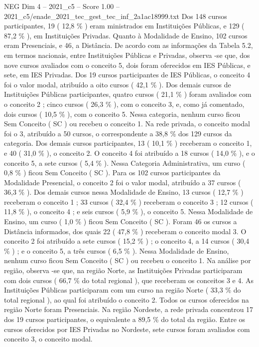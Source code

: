 \begin{textsample}{NEG Dim 4 – 2021\_c5 – Score 1.00 – 2021\_c5/enade\_2021\_tec\_gest\_tec\_inf\_2a1ac18999.txt}
Dos 148 cursos participantes, 19 ( 12,8 \% ) eram ministrados em Instituições Públicas, e 129 ( 87,2 \% ), em Instituições Privadas.
Quanto à Modalidade de Ensino, 102 cursos eram Presenciais, e 46, a Distância.
De acordo com as informações da Tabela 5.2, em termos nacionais, entre Instituições Públicas e Privadas, observa -se que, dos nove cursos avaliados com o conceito 5, dois foram oferecidos em IES Públicas, e sete, em IES Privadas.
Dos 19 cursos participantes de IES Públicas, o conceito 4 foi o valor modal, atribuído a oito cursos ( 42,1 \% ).
Dos demais cursos de Instituições Públicas participantes, quatro cursos ( 21,1 \% ) foram avaliados com o conceito 2 ; cinco cursos ( 26,3 \% ), com o conceito 3, e, como já comentado, dois cursos ( 10,5 \% ), com o conceito 5.
Nessa categoria, nenhum curso ficou Sem Conceito ( SC ) ou recebeu o conceito 1.
Na rede privada, o conceito modal foi o 3, atribuído a 50 cursos, o correspondente a 38,8 \% dos 129 cursos da categoria.
Dos demais cursos participantes, 13 ( 10,1 \% ) receberam o conceito 1, e 40 ( 31,0 \% ), o conceito 2.
O conceito 4 foi atribuído a 18 cursos ( 14,0 \% ), e o conceito 5, a sete cursos ( 5,4 \% ).
Nessa Categoria Administrativa, um curso ( 0,8 \% ) ficou Sem Conceito ( SC ).
Para os 102 cursos participantes da Modalidade Presencial, o conceito 2 foi o valor modal, atribuído a 37 cursos ( 36,3 \% ).
Dos demais cursos nessa Modalidade de Ensino, 13 cursos ( 12,7 \% ) receberam o conceito 1 ; 33 cursos ( 32,4 \% ) receberam o conceito 3 ; 12 cursos ( 11,8 \% ), o conceito 4 ; e seis cursos ( 5,9 \% ), o conceito 5.
Nessa Modalidade de Ensino, um curso ( 1,0 \% ) ficou Sem Conceito ( SC ).
Foram 46 os cursos a Distância informados, dos quais 22 ( 47,8 \% ) receberam o conceito modal 3.
O conceito 2 foi atribuído a sete cursos ( 15,2 \% ) ; o conceito 4, a 14 cursos ( 30,4 \% ) ; e o conceito 5, a três cursos ( 6,5 \% ).
Nessa Modalidade de Ensino, nenhum curso ficou Sem Conceito ( SC ) ou recebeu o conceito 1.
Na análise por região, observa -se que, na região Norte, as Instituições Privadas participaram com dois cursos ( 66,7 \% do total regional ), que receberam os conceitos 3 e 4.
As Instituições Públicas participaram com um curso na região Norte ( 33,3 \% do total regional ), ao qual foi atribuído o conceito 2.
Todos os cursos oferecidos na região Norte foram Presenciais.
Na região Nordeste, a rede privada concentrou 17 dos 19 cursos participantes, o equivalente a 89,5 \% do total da região.
Entre os cursos oferecidos por IES Privadas no Nordeste, sete cursos foram avaliados com conceito 3, o conceito modal.

\end{textsample}
